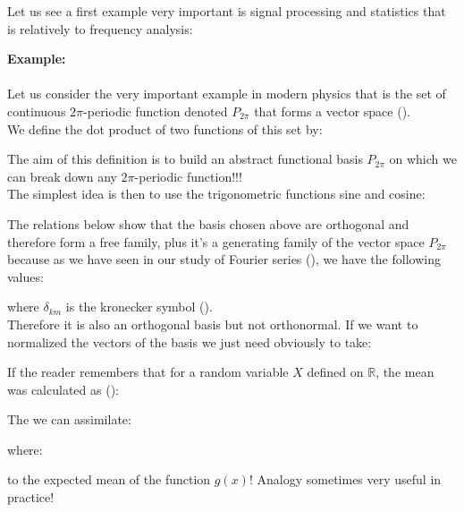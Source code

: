 	Let us see a first example very important is signal processing and statistics that is relatively to frequency analysis:
	\begin{tcolorbox}[colframe=black,colback=white,sharp corners]
	\textbf{{\Large {}}Example:}\\\\
	Let us consider the very important example in modern physics that is the set of continuous $2\pi$-periodic function denoted $P_{2\pi}$ that forms a vector space ().\\
	
	We define the dot product of two functions of this set by:
	
	The aim of this definition is to build an abstract functional basis $P_{2\pi}$ on which we can break down any $2\pi$-periodic function!!!\\
	
	The simplest idea is then to use the trigonometric functions sine and cosine:
	
	The relations below show that the basis chosen above are orthogonal and therefore form a free family, plus it's a generating family of the vector space $P_{2\pi}$ because as we have seen in our study of Fourier series (), we have the following values:
	
	where $\delta_{km}$ is the kronecker symbol ().\\
	
	Therefore it is also an orthogonal basis but not orthonormal. If we want to normalized the vectors of the basis we just need obviously to take:
	
	\end{tcolorbox}
	\begin{tcolorbox}[title=Remark,colframe=black,arc=10pt]
	If the reader remembers that for a random variable $X$ defined on $\mathbb{R}$, the mean was calculated as ():
	
	The we can assimilate:
	
	where:
	
	to the expected mean of the function $g(x)$! Analogy sometimes very useful in practice!
	\end{tcolorbox}

